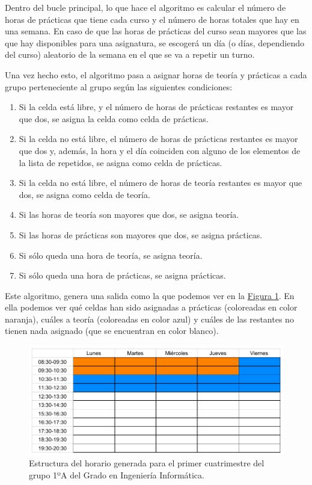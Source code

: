 Dentro del bucle principal, lo que hace el algoritmo es calcular el número de horas de prácticas que tiene cada curso y el número de horas totales que hay en una semana. En caso de que las horas de prácticas del curso sean mayores que las que hay disponibles para una asignatura, se escogerá un día (o días, dependiendo del curso) aleatorio de la semana en el que se va a repetir un turno.

Una vez hecho esto, el algoritmo pasa a asignar horas de teoría y prácticas a cada grupo perteneciente al grupo según las siguientes condiciones:

\begin{enumerate}
  \item Si la celda está libre, y el número de horas de prácticas restantes es mayor que dos, se asigna la celda como celda de prácticas.
  \item Si la celda no está libre, el número de horas de prácticas restantes es mayor que dos y, además, la hora y el día coinciden con alguno de los elementos de la lista de repetidos, se asigna como celda de prácticas.
  \item Si la celda no está libre, el número de horas de teoría restantes es mayor que dos, se asigna como celda de teoría.
  \item Si las horas de teoría son mayores que dos, se asigna teoría.
  \item Si las horas de prácticas son mayores que dos, se asigna prácticas.
  \item Si sólo queda una hora de teoría, se asigna teoría.
  \item Si sólo queda una hora de prácticas, se asigna prácticas.
\end{enumerate}

Este algoritmo, genera una salida como la que podemos ver en la \hyperref[estructura1]{Figura \ref*{estructura1}}. En ella podemos ver qué celdas han sido asignadas a prácticas (coloreadas en color naranja), cuáles a teoría (coloreadas en color azul) y cuáles de las restantes no tienen nada asignado (que se encuentran en color blanco).

\begin{figure}[H]
\centering
\includegraphics[width=1\textwidth]{img/estructura1}
\caption{Estructura del horario generada para el primer cuatrimestre del grupo 1ºA del Grado en Ingeniería Informática.}
\label{estructura1}
\end{figure}

